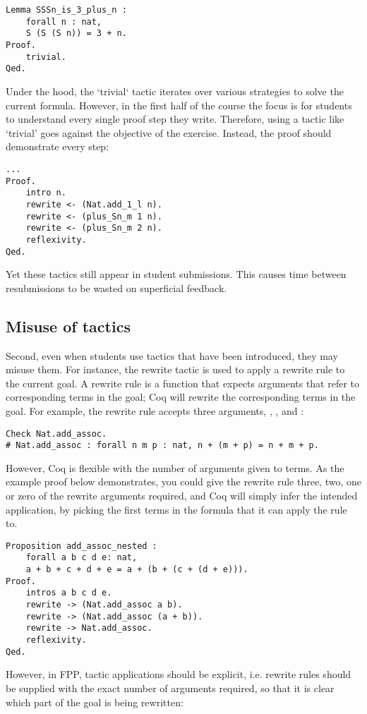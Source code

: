 \begin{verbatim}
Lemma SSSn_is_3_plus_n :
    forall n : nat,
    S (S (S n)) = 3 + n.
Proof.
    trivial.
Qed.
\end{verbatim}
Under the hood, the ‘trivial‘ tactic iterates over various strategies to solve the current formula. However, in the first half of the course the focus is for students to understand every single proof step they write. Therefore, using a tactic like ‘trivial' goes against the objective of the exercise. Instead, the proof should demonstrate every step:

\begin{verbatim}
...
Proof.
    intro n.
    rewrite <- (Nat.add_1_l n).
    rewrite <- (plus_Sn_m 1 n).
    rewrite <- (plus_Sn_m 2 n).
    reflexivity.
Qed.
\end{verbatim}
Yet these tactics still appear in student submissions. This causes time between resubmissions to be wasted on superficial feedback.

\subsection{Misuse of tactics}
\label{misuse-of-tactics}
Second, even when students use tactics that have been introduced, they may misuse them. For instance, the rewrite tactic is used to apply a rewrite rule to the current goal. A rewrite rule is a function that expects arguments that refer to corresponding terms in the goal; Coq will rewrite the corresponding terms in the goal. For example, the rewrite rule  accepts three arguments, , , and :

\begin{verbatim}
Check Nat.add_assoc.
# Nat.add_assoc : forall n m p : nat, n + (m + p) = n + m + p.
\end{verbatim}
However, Coq is flexible with the number of arguments given to terms. As the example proof below demonstrates, you could give the rewrite rule three, two, one or zero of the rewrite arguments required, and Coq will simply infer the intended application, by picking the first terms in the formula that it can apply the rule to.

\begin{verbatim}
Proposition add_assoc_nested :
    forall a b c d e: nat,
    a + b + c + d + e = a + (b + (c + (d + e))).
Proof.
    intros a b c d e.
    rewrite -> (Nat.add_assoc a b).
    rewrite -> (Nat.add_assoc (a + b)).
    rewrite -> Nat.add_assoc.
    reflexivity.
Qed.
\end{verbatim}
However, in FPP, tactic applications should be explicit, i.e. rewrite rules should be supplied with the exact number of arguments required, so that it is clear which part of the goal is being rewritten:

